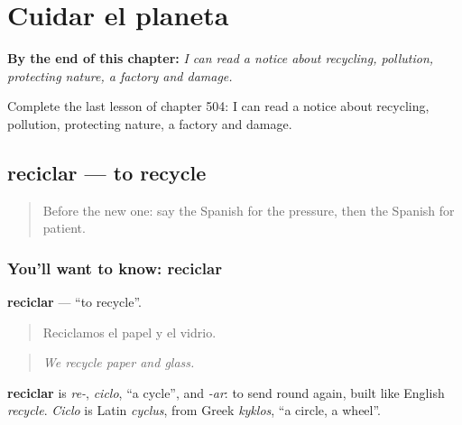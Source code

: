 
\chapter{Cuidar el planeta}
\label{ch:es-cuidar-el-planeta}

\begin{chapteropening}
\textbf{By the end of this chapter:} \emph{I can read a notice about recycling, pollution, protecting nature, a factory and damage.}

Complete the last lesson of chapter 504: I can read a notice about recycling, pollution, protecting nature, a factory and damage.
\end{chapteropening}

\section[reciclar]{reciclar — to recycle}

\label{lesson:ES-C504-reciclar}



\begin{quote}
Before the new one: say the Spanish for the pressure, then the Spanish for patient.
\end{quote}

\subsection*{You'll want to know: reciclar}
\textbf{reciclar} — \textquotedblleft{}to recycle\textquotedblright{}.

\begin{quote}
Reciclamos el papel y el vidrio.
\end{quote}

\begin{quote}
\emph{We recycle paper and glass.}
\end{quote}

\begin{cousinweb}
\textbf{reciclar} is \emph{re-}, \emph{ciclo}, \textquotedblleft{}a cycle\textquotedblright{}, and \emph{-ar}: to send round again, built like English \emph{recycle}. \emph{Ciclo} is Latin \emph{cyclus}, from Greek \emph{kyklos}, \textquotedblleft{}a circle, a wheel\textquotedblright{}.
\end{cousinweb}


